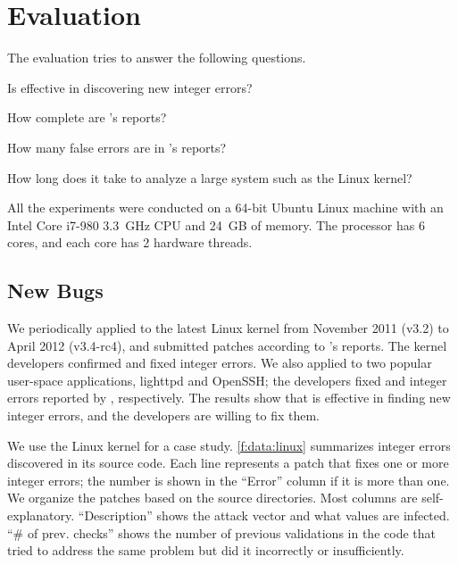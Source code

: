 \section{Evaluation}
\label{s:eval}

The evaluation tries to answer the following questions.
\begin{CompactItemize}
\item
Is \sys effective in discovering new integer errors?
\item
How complete are \sys's reports?
\item
How many false errors are in \sys's reports?
\item
How long does it take \sys to analyze a large system such
as the Linux kernel?
\end{CompactItemize}

All the experiments were conducted on a 64-bit Ubuntu Linux machine
with an Intel Core i7-980 3.3~GHz CPU and 24~GB of memory.  The
processor has 6 cores, and each core has 2 hardware threads.

\subsection{New Bugs}
\label{s:eval:linux}

We periodically applied \sys to the latest Linux kernel
from November 2011 (v3.2) to April 2012 (v3.4-rc4),
and submitted patches according to \sys's reports.
The kernel developers confirmed and fixed \nrbugslinux integer errors.
%
We also applied \sys to two popular user-space applications, lighttpd
and OpenSSH; the developers fixed \nrbugslighttpd and \nrbugsopenssh
integer errors reported by \sys, respectively.
%
The results show that \sys is effective in finding new integer
errors, and the developers are willing to fix them.

We use the Linux kernel for a case study.  \autoref{f:data:linux}
summarizes integer errors \sys discovered in its source code.
Each line represents a patch that fixes one or more integer errors; the
number is shown in the ``Error'' column if it is more than one.  We
organize the patches based on the source directories.  Most
columns are self-explanatory.  ``Description'' shows the attack
vector and what values are infected.  ``\# of prev. checks'' shows
the number of previous validations in the code that tried to address the 
same problem but did it incorrectly or insufficiently. 


